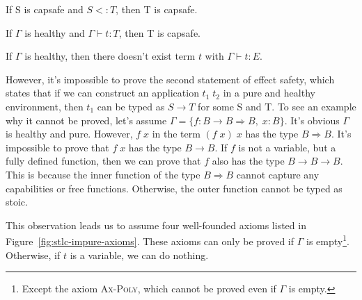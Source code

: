 \begin{lemma}
 If S is capsafe and $S <: T$, then T is capsafe.
\end{lemma}

\begin{lemma}
  If $\Gamma$ is healthy and $\Gamma \vdash t : T$, then T is capsafe.
\end{lemma}

\begin{theorem}
  If $\Gamma$ is healthy, then there doesn't exist term $t$ with
  $\Gamma \vdash t : E$.
\end{theorem}

However, it's impossible to prove the second statement of effect
safety, which states that if we can construct an application
$t_1 \; t_2$ in a pure and healthy environment, then $t_1$ can be
typed as $S \to T$ for some S and T. To see an example why it cannot
be proved, let's assume
$\Gamma = \{f: B \to B \Rightarrow B, \; x: B\}$. It's obvious
$\Gamma$ is healthy and pure. However, $f \; x$ in the term
$(f \; x) \;x$ has the type $B \Rightarrow B$. It's impossible to
prove that $f \; x$ has the type $B \to B$. If $f$ is not a variable,
but a fully defined function, then we can prove that $f$ also has the
type $B \to B \to B$. This is because the inner function of the type
$B \Rightarrow B$ cannot capture any capabilities or free functions.
Otherwise, the outer function cannot be typed as stoic.

This observation leads us to assume four well-founded axioms listed in
Figure~\ref{fig:stlc-impure-axioms}. These axioms can only be proved
if $\Gamma$ is empty\footnote{Except the axiom \textsc{Ax-Poly}, which
  cannot be proved even if $\Gamma$ is empty.}. Otherwise, if $t$ is a
variable, we can do nothing.

